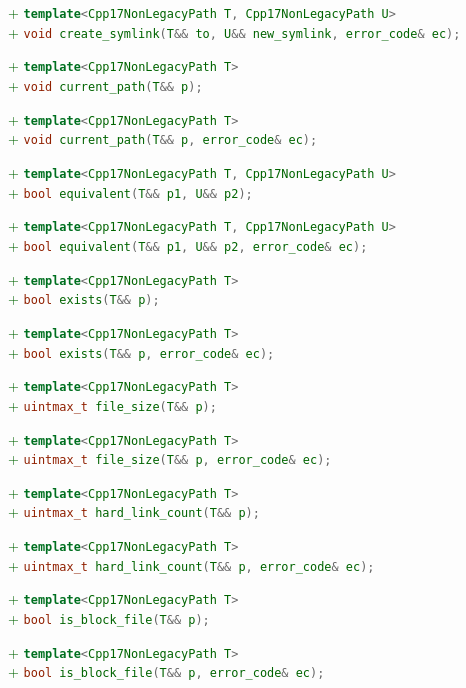 \documentclass[11pt]{article}
\newcommand{\code}[2][cpp]{\lstinline[language=#1,basicstyle=\small\ttfamily]{#2}}
\newcommand{\tsreplace}[3]{\textcolor{red}{\sout{#1}}#2\textcolor{darkgreen}{#3}}
\begin{document}
\tsreplace{}{}{+ \code{template<Cpp17NonLegacyPath T, Cpp17NonLegacyPath U>}}\\
\tsreplace{}{}{+ \code{void create_symlink(T&& to, U&& new_symlink, error_code& ec);}}

\tsreplace{}{}{+ \code{template<Cpp17NonLegacyPath T>}}\\
\tsreplace{}{}{+ \code{void current_path(T&& p);}}

\tsreplace{}{}{+ \code{template<Cpp17NonLegacyPath T>}}\\
\tsreplace{}{}{+ \code{void current_path(T&& p, error_code& ec);}}

\tsreplace{}{}{+ \code{template<Cpp17NonLegacyPath T, Cpp17NonLegacyPath U>}}\\
\tsreplace{}{}{+ \code{bool equivalent(T&& p1, U&& p2);}}

\tsreplace{}{}{+ \code{template<Cpp17NonLegacyPath T, Cpp17NonLegacyPath U>}}\\
\tsreplace{}{}{+ \code{bool equivalent(T&& p1, U&& p2, error_code& ec);}}

\tsreplace{}{}{+ \code{template<Cpp17NonLegacyPath T>}}\\
\tsreplace{}{}{+ \code{bool exists(T&& p);}}

\tsreplace{}{}{+ \code{template<Cpp17NonLegacyPath T>}}\\
\tsreplace{}{}{+ \code{bool exists(T&& p, error_code& ec);}}

\tsreplace{}{}{+ \code{template<Cpp17NonLegacyPath T>}}\\
\tsreplace{}{}{+ \code{uintmax_t file_size(T&& p);}}

\tsreplace{}{}{+ \code{template<Cpp17NonLegacyPath T>}}\\
\tsreplace{}{}{+ \code{uintmax_t file_size(T&& p, error_code& ec);}}

\tsreplace{}{}{+ \code{template<Cpp17NonLegacyPath T>}}\\
\tsreplace{}{}{+ \code{uintmax_t hard_link_count(T&& p);}}

\tsreplace{}{}{+ \code{template<Cpp17NonLegacyPath T>}}\\
\tsreplace{}{}{+ \code{uintmax_t hard_link_count(T&& p, error_code& ec);}}

\tsreplace{}{}{+ \code{template<Cpp17NonLegacyPath T>}}\\
\tsreplace{}{}{+ \code{bool is_block_file(T&& p);}}

\tsreplace{}{}{+ \code{template<Cpp17NonLegacyPath T>}}\\
\tsreplace{}{}{+ \code{bool is_block_file(T&& p, error_code& ec);}}
\end{document}
